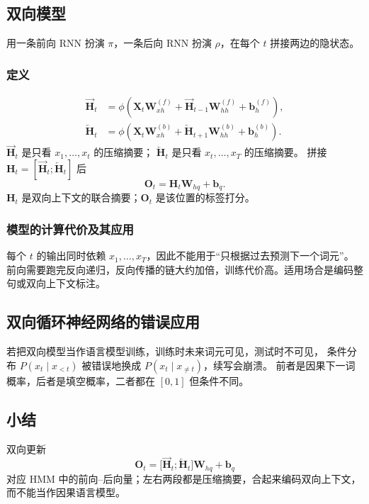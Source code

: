 \subsection{双向模型}

用一条前向 RNN 扮演 $\pi$，一条后向 RNN 扮演 $\rho$，在每个 $t$ 拼接两边的隐状态。

\subsubsection{定义}

\begin{align*}
\overrightarrow{\bm{H}}_t
&=
\phi(\bm{X}_t\bm{W}_{xh}^{(f)}+\overrightarrow{\bm{H}}_{t-1}\bm{W}_{hh}^{(f)}+\bm{b}_h^{(f)}),
\\
\overleftarrow{\bm{H}}_t
&=
\phi(\bm{X}_t\bm{W}_{xh}^{(b)}+\overleftarrow{\bm{H}}_{t+1}\bm{W}_{hh}^{(b)}+\bm{b}_h^{(b)}).
\end{align*}
$\overrightarrow{\bm{H}}_t$ 是只看 $x_1,\ldots,x_t$ 的压缩摘要；
$\overleftarrow{\bm{H}}_t$ 是只看 $x_t,\ldots,x_T$ 的压缩摘要。
拼接 $\bm{H}_t=[\overrightarrow{\bm{H}}_t;\overleftarrow{\bm{H}}_t]$ 后
\[
\bm{O}_t=\bm{H}_t\bm{W}_{hq}+\bm{b}_q.
\]
$\bm{H}_t$ 是双向上下文的联合摘要；$\bm{O}_t$ 是该位置的标签打分。

\subsubsection{模型的计算代价及其应用}

每个 $t$ 的输出同时依赖 $x_1,\ldots,x_T$，因此不能用于“只根据过去预测下一个词元”。
前向需要跑完反向递归，反向传播的链大约加倍，训练代价高。适用场合是编码整句或双向上下文标注。

\subsection{双向循环神经网络的错误应用}

若把双向模型当作语言模型训练，训练时未来词元可见，测试时不可见，
条件分布 $P(x_t \mid x_{<t})$ 被错误地换成 $P(x_t \mid x_{\neq t})$，续写会崩溃。
前者是因果下一词概率，后者是填空概率，二者都在 $[0,1]$ 但条件不同。

\subsection{小结}

双向更新
\[
\bm{O}_t=\bigl[\overrightarrow{\bm{H}}_t;\overleftarrow{\bm{H}}_t\bigr]\bm{W}_{hq}+\bm{b}_q
\]
对应 HMM 中的前向--后向量；左右两段都是压缩摘要，合起来编码双向上下文，而不能当作因果语言模型。

